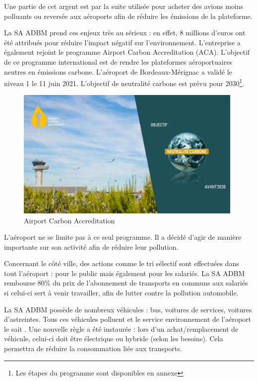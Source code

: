 Une partie de cet argent est par la suite utilisée pour acheter des avions moins polluants ou reversée aux aéroports afin de réduire les émissions de la plateforme.\newline

La SA ADBM prend ces enjeux très au sérieux : en effet, 8 millions d'euros ont été attribués pour réduire l'impact négatif sur l'environnement.
L'entreprise a également rejoint le programme Airport Carbon Accreditation (ACA). L'objectif de ce programme international est de rendre les plateformes aéroportuaires neutres en émissions carbone.
L'aéroport de Bordeaux-Mérignac a validé le niveau 1 le 11 juin 2021. L'objectif de neutralité carbone est prévu pour 2030\footnote{Les étapes du programme sont disponibles en annexe}.

\begin{figure}[hbt!]
  \centering
  \includegraphics[width=11cm]{Images/aca2030.jpg}
  \caption{Airport Carbon Accreditation}
  \label{fig:aca2030}
\end{figure}


L'aéroport ne se limite pas à ce seul programme. Il a décidé d'agir de manière importante sur son activité afin de réduire leur pollution.


Concernant le côté ville, des actions comme le tri sélectif sont effectuées dans tout l'aéroport : pour le public mais également pour les salariés. La SA ADBM rembourse 80\% du prix de l'abonnement de transports en communs aux salariés si celui-ci sert à venir travailler, afin de lutter contre la pollution automobile.


La SA ADBM possède de nombreux véhicules : bus, voitures de services, voitures d'astreintes. Tous ces véhicules polluent et le service environnement de l'aéroport le sait . Une nouvelle règle a été instaurée : lors d'un achat/remplacement de véhicule, celui-ci doit être électrique ou hybride (selon les besoins). Cela permettra de réduire la consommation liée aux transports.\newline


